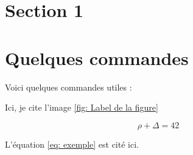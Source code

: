 \documentclass{rapportCS}
\begin{document}
\newpage

\section{Section 1}




\section{Quelques commandes}

Voici quelques commandes utiles :



Ici, je cite l'image \ref{fig: Label de la figure}



\begin{equation} \label{eq: exemple}
\rho + \Delta = 42
\end{equation}

L'équation \ref{eq: exemple} est cité ici. 
\end{document}
